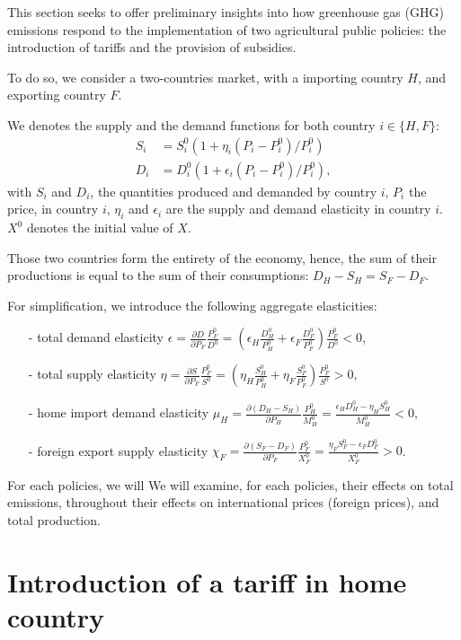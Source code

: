
This section seeks to offer preliminary insights into how greenhouse gas (GHG) emissions respond to the implementation of two agricultural public policies: the introduction of tariffs and the provision of subsidies.

To do so, we consider a two-countries market, with a importing country $H$, and exporting country $F$.

We denotes the supply and the demand functions for both country $i \in \{H, F\}$: 
\begin{align*}
S_i &= S_i^0 \left( 1+\eta_i \left( P_i-P^0_i \right)/P_i^0 \right) \\ 
D_i &= D_i^0 \left( 1+\epsilon_i \left( P_i-P_i^0 \right)/P_i^0 \right),
\end{align*}
with $S_i$ and $D_i$, the quantities produced and demanded by country $i$, $P_i$ the price, in country $i$, $\eta_i$ and $\epsilon_i$ are the supply and demand elasticity in country $i$. $X^0$ denotes the initial value of $X$.

Those two countries form the entirety of the economy, hence, the sum of their productions is equal to the sum of their consumptions: $D_H-S_H = S_F-D_F$.

For simplification, we introduce the following aggregate elasticities:
\begin{itemize}
    \item[-] total demand elasticity $\epsilon=\frac{\partial D}{\partial P_F} \frac{P_F^0}{D^0}= \left( \epsilon_H \frac{D_H^0}{P_H^0}+\epsilon_F \frac{D_F^0}{P_F^0} \right)\frac{P_F^0}{D^0} < 0$,
    \item[-] total supply elasticity $\eta=\frac{\partial S}{\partial P_F}\frac{P_F^0}{S^0}=\left( \eta_H \frac{S_H^0}{P_H^0}+\eta_F \frac{S_F^0}{P_F^0} \right)\frac{P_F^0}{S^0} > 0$,
    \item[-] home import demand elasticity $\mu_H= \frac{\partial (D_H-S_H)}{\partial P_H}\frac{P_H^0}{M_H^0}=\frac{\epsilon_H D_H^0-\eta_H S_H^0}{M_H^0}<0$,
    \item[-] foreign export supply elasticity $\chi_F=\frac{\partial (S_F-D_F)}{\partial P_F}\frac{P_F^0}{X_F^0}=\frac{\eta_F S_F^0-\epsilon_F D_F^0}{X_F^0}>0$.
\end{itemize}

For each policies, we will We will examine, for each policies, their effects on total emissions, throughout their effects on international prices (foreign prices), and total production.


\section{Introduction of a tariff in home country}\label{Sec_tariff}

